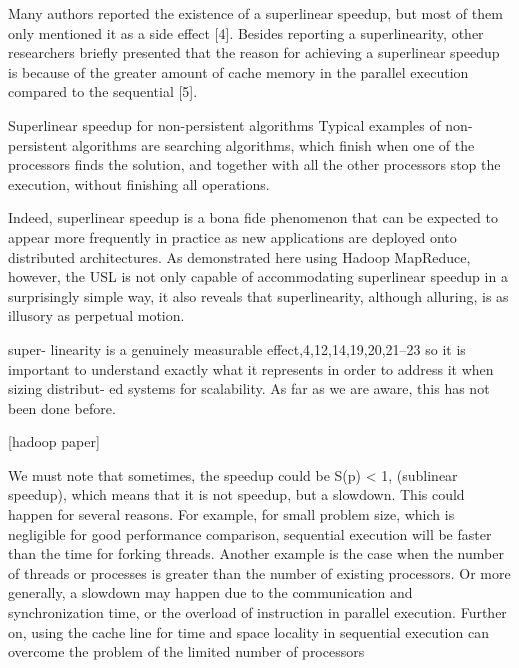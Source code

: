 Many authors reported the existence of a superlinear
speedup, but most of them only mentioned it as a side effect
[4]. Besides reporting a superlinearity, other researchers briefly
presented that the reason for achieving a superlinear speedup
is because of the greater amount of cache memory in the
parallel execution compared to the sequential [5].


Superlinear speedup for non-persistent algorithms
Typical examples of non-persistent algorithms are searching
algorithms, which finish when one of the processors finds
the solution, and together with all the other processors stop
the execution, without finishing all operations.

Indeed, superlinear speedup is a bona fide
phenomenon that can be expected to appear more
frequently in practice as new applications are deployed
onto distributed architectures. As demonstrated
here using Hadoop MapReduce, however, the USL
is not only capable of accommodating superlinear
speedup in a surprisingly simple way, it also reveals
that superlinearity, although alluring, is as illusory as
perpetual motion.

super-
linearity is a genuinely measurable
effect,4,12,14,19,20,21–23 so it is important to
understand exactly what it represents in
order to address it when sizing distribut-
ed systems for scalability. As far as we are
aware, this has not been done before.

[hadoop paper]

We must note that sometimes, the speedup could be S(p) <
1, (sublinear speedup), which means that it is not speedup,
but a slowdown. This could happen for several reasons. For
example, for small problem size, which is negligible for good
performance comparison, sequential execution will be faster
than the time for forking threads. Another example is the case
when the number of threads or processes is greater than the
number of existing processors. Or more generally, a slowdown
may happen due to the communication and synchronization
time, or the overload of instruction in parallel execution.
Further on, using the cache line for time and space locality in
sequential execution can overcome the problem of the limited
number of processors

